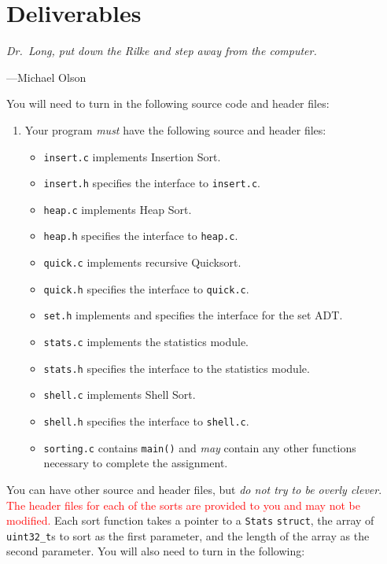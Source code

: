 \section{Deliverables}

\epigraph{\emph{Dr.\ Long, put down the Rilke and step away from the
computer.}}{---Michael Olson}

You will need to turn in the following source code and header files:

\begin{enumerate}
  \item Your program \emph{must} have the following source and header
    files:
  \begin{itemize}
    \item \texttt{insert.c} implements Insertion Sort.
    \item \texttt{insert.h} specifies the interface to \texttt{insert.c}.
    \item \texttt{heap.c} implements Heap Sort.
    \item \texttt{heap.h} specifies the interface to \texttt{heap.c}.
    \item \texttt{quick.c} implements recursive Quicksort.
    \item \texttt{quick.h} specifies the interface to \texttt{quick.c}.
    \item \texttt{set.h} implements and specifies the interface for the
      set ADT.
    \item \texttt{stats.c} implements the statistics module.
    \item \texttt{stats.h} specifies the interface to the statistics
      module.
    \item \texttt{shell.c} implements Shell Sort.
    \item \texttt{shell.h} specifies the interface to \texttt{shell.c}.
    \item \texttt{sorting.c} contains \texttt{main()} and \emph{may}
      contain any other functions necessary to complete the assignment.
  \end{itemize}
\end{enumerate}

You can have other source and header files, but \emph{do not try to be
overly clever}. \textcolor{red}{The header files for each of the sorts
are provided to you and may not be modified.} Each sort function takes a
pointer to a \texttt{Stats} \texttt{struct}, the array of
\texttt{uint32\_t}s to sort as the first parameter, and the length of
the array as the second parameter. You will also need to turn in the
following:

